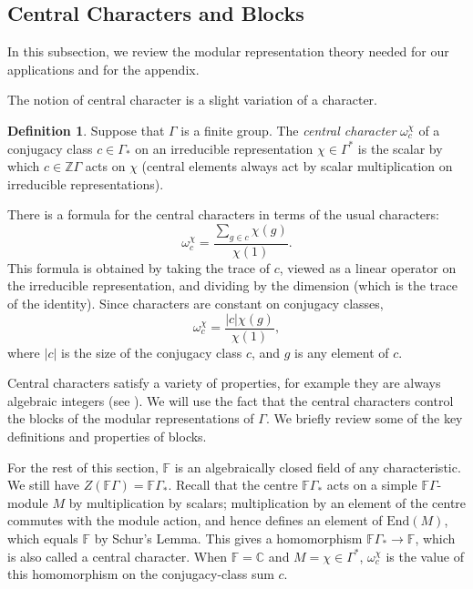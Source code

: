 \documentclass[10pt]{article}
\theoremstyle{definition}
\newtheorem{definition}[theorem]{Definition}
\begin{document}
 

\subsection{Central Characters and Blocks} \label{mod_rep_thy_subsect}

In this subsection, we review the modular representation theory needed for our applications and for the appendix.

The notion of central character is a slight variation of a character.
\begin{definition}
Suppose that $\Gamma$ is a finite group. The \emph{central character} $\omega_c^\chi$ of a conjugacy class $c \in \Gamma_*$ on an irreducible representation $\chi \in \Gamma^*$ is the scalar by which $c \in \mathbb{Z}\Gamma$ acts on $\chi$ \textup{(}central elements always act by scalar multiplication on irreducible representations\textup{)}.
\end{definition}

There is a formula for the central characters in terms of the usual characters:
\[
\omega_c^\chi = \frac{\sum_{g \in c} \chi(g)}{\chi(1)}.
\]
This formula is obtained by taking the trace of $c$, viewed as a linear operator on the irreducible representation, and dividing by the dimension (which is the trace of the identity). Since characters are constant on conjugacy classes,
\[
\omega_c^\chi = \frac{|c|\chi(g)}{\chi(1)},
\]
where $|c|$ is the size of the conjugacy class $c$, and $g$ is any element of $c$.

Central characters satisfy a variety of properties, for example they are always algebraic integers (see \cite[Proposition 5.3.2]{EtingofEtAl}). We will use the fact that the central characters control the blocks of the modular representations of $\Gamma$. We briefly review some of the key definitions and properties of blocks.

For the rest of this section, $\mathbb{F}$ is an algebraically closed field of any characteristic. We still have $Z(\mathbb{F}\Gamma) = \mathbb{F}\Gamma_*$. Recall that the centre $\mathbb{F}\Gamma_*$ acts on a simple $\mathbb{F}\Gamma$-module $M$ by multiplication by scalars; multiplication by an element of the centre commutes with the module action, and hence defines an element of $\mathrm{End}(M)$, which equals $\mathbb{F}$ by Schur's Lemma. This gives a homomorphism $\mathbb{F}\Gamma_* \to \mathbb{F}$, which is also called a central character. When $\mathbb{F} = \mathbb{C}$ and $M = \chi \in \Gamma^*$, $\omega_c^\chi$ is the value of this homomorphism on the conjugacy-class sum $c$.
\end{document}
